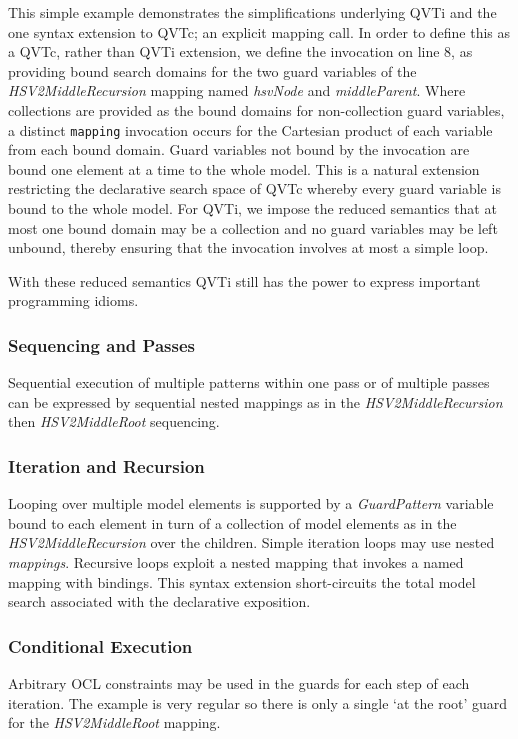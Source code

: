This simple example demonstrates the simplifications underlying QVTi and the one syntax extension to QVTc; an explicit mapping call. In order to define this as a QVTc, rather than QVTi extension, we define the invocation on line 8, as providing bound search domains for the two guard variables of the \textit{HSV2MiddleRecursion} mapping named \textit{hsvNode} and \textit{middleParent}. Where collections are provided as the bound domains for non-collection guard variables, a distinct \texttt{mapping} invocation occurs for the Cartesian product of each variable from each bound domain. Guard variables not bound by the invocation are bound one element at a time to the whole model. This is a natural extension restricting the declarative search space of QVTc whereby every guard variable is bound to the whole model. For QVTi, we impose the reduced semantics that at most one bound domain may be a collection and no guard variables may be left unbound, thereby ensuring that the invocation involves at most a simple loop.

With these reduced semantics QVTi still has the power to express important programming idioms.

\subsubsection{Sequencing and Passes}
Sequential execution of multiple patterns within one pass or of multiple passes can be expressed by sequential nested mappings as in the \textit{HSV2MiddleRecursion} then \textit{HSV2MiddleRoot} sequencing.

\subsubsection{Iteration and Recursion}
Looping over multiple model elements is supported by a \textit{GuardPattern} variable bound to each element in turn of a collection of model elements as in the \textit{HSV2MiddleRecursion} over the children. Simple iteration loops may use nested \textit{mappings}. Recursive loops exploit a nested mapping that invokes a named mapping with bindings. This syntax extension short-circuits the total model search associated with the declarative exposition.  

\subsubsection{Conditional Execution}
Arbitrary OCL constraints may be used in the guards for each step of each iteration. The example is very regular so there is only a single `at the root' guard for the \textit{HSV2MiddleRoot} mapping.

